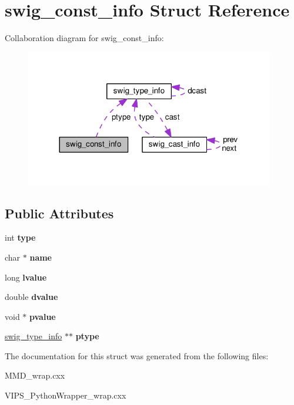 \hypertarget{structswig__const__info}{}\section{swig\+\_\+const\+\_\+info Struct Reference}
\label{structswig__const__info}


Collaboration diagram for swig\+\_\+const\+\_\+info\+:
\nopagebreak
\begin{figure}[H]
\begin{center}
\leavevmode
\includegraphics[width=308pt]{structswig__const__info__coll__graph}
\end{center}
\end{figure}
\subsection*{Public Attributes}
\begin{DoxyCompactItemize}
\item 
int {\bfseries type}\hypertarget{structswig__const__info_ae8bbc99e1cda11f24e306365cbf33893}{}\label{structswig__const__info_ae8bbc99e1cda11f24e306365cbf33893}

\item 
char $\ast$ {\bfseries name}\hypertarget{structswig__const__info_adb8a1bc6fcbfb39737a9dc72dfabf8f1}{}\label{structswig__const__info_adb8a1bc6fcbfb39737a9dc72dfabf8f1}

\item 
long {\bfseries lvalue}\hypertarget{structswig__const__info_af142e4c21ad4fe61f6c2624bff034583}{}\label{structswig__const__info_af142e4c21ad4fe61f6c2624bff034583}

\item 
double {\bfseries dvalue}\hypertarget{structswig__const__info_a74e477f1dbf515bcb7e2ef07a1d34c35}{}\label{structswig__const__info_a74e477f1dbf515bcb7e2ef07a1d34c35}

\item 
void $\ast$ {\bfseries pvalue}\hypertarget{structswig__const__info_a37585059046a4951907eb779c97e7cc8}{}\label{structswig__const__info_a37585059046a4951907eb779c97e7cc8}

\item 
\hyperlink{structswig__type__info}{swig\+\_\+type\+\_\+info} $\ast$$\ast$ {\bfseries ptype}\hypertarget{structswig__const__info_a374efde326bb281d91791c91306e3f08}{}\label{structswig__const__info_a374efde326bb281d91791c91306e3f08}

\end{DoxyCompactItemize}


The documentation for this struct was generated from the following files\+:\begin{DoxyCompactItemize}
\item 
M\+M\+D\+\_\+wrap.\+cxx\item 
V\+I\+P\+S\+\_\+\+Python\+Wrapper\+\_\+wrap.\+cxx\end{DoxyCompactItemize}
